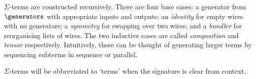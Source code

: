 \(\Sigma\)-terms are constructed recursively.
There are four base cases: a generator from \(\generators\) with appropriate
inputs and outputs;
an \emph{identity} for empty wires with no generators;
a \emph{symmetry} for swapping over two wires;
and a \emph{bundler} for reorganising lists of wires.
The two inductive cases are called \emph{composition} and \emph{tensor}
respectively.
Intuitively, these can be thought of generating larger terms by sequencing
subterms in sequence or parallel.

\(\Sigma\)-terms will be abbreviated to `terms' when the signature is clear from
context.